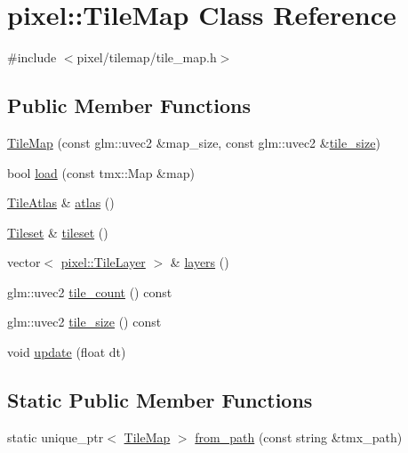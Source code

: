 \hypertarget{classpixel_1_1_tile_map}{}\section{pixel\+:\+:Tile\+Map Class Reference}
\label{classpixel_1_1_tile_map}


{\ttfamily \#include $<$pixel/tilemap/tile\+\_\+map.\+h$>$}

\subsection*{Public Member Functions}
\begin{DoxyCompactItemize}
\item 
\hyperlink{classpixel_1_1_tile_map_adf716168df4051a1f80294951bd7f547}{Tile\+Map} (const glm\+::uvec2 \&map\+\_\+size, const glm\+::uvec2 \&\hyperlink{classpixel_1_1_tile_map_a35e0e8c1f7e3a0739d494929111788cd}{tile\+\_\+size})
\item 
bool \hyperlink{classpixel_1_1_tile_map_a80157d358cbf2eac67adf489057f12fe}{load} (const tmx\+::\+Map \&map)
\item 
\hyperlink{classpixel_1_1_tile_atlas}{Tile\+Atlas} \& \hyperlink{classpixel_1_1_tile_map_a4e88b7241ae5372c0d5e8a102a8eb5e3}{atlas} ()
\item 
\hyperlink{classpixel_1_1_tileset}{Tileset} \& \hyperlink{classpixel_1_1_tile_map_a8c23bb5298f9287a200e29d0eb49ec2d}{tileset} ()
\item 
vector$<$ \hyperlink{classpixel_1_1_tile_layer}{pixel\+::\+Tile\+Layer} $>$ \& \hyperlink{classpixel_1_1_tile_map_a40f23bebe94eee1130692085235c14d5}{layers} ()
\item 
glm\+::uvec2 \hyperlink{classpixel_1_1_tile_map_a8e6564adbe2b58920c5f76369aa819a6}{tile\+\_\+count} () const
\item 
glm\+::uvec2 \hyperlink{classpixel_1_1_tile_map_a35e0e8c1f7e3a0739d494929111788cd}{tile\+\_\+size} () const
\item 
void \hyperlink{classpixel_1_1_tile_map_a34588a5a50421385dcd8f27d51698e12}{update} (float dt)
\end{DoxyCompactItemize}
\subsection*{Static Public Member Functions}
\begin{DoxyCompactItemize}
\item 
static unique\+\_\+ptr$<$ \hyperlink{classpixel_1_1_tile_map}{Tile\+Map} $>$ \hyperlink{classpixel_1_1_tile_map_a77e1743a14959704fb14a94948f7af66}{from\+\_\+path} (const string \&tmx\+\_\+path)
\end{DoxyCompactItemize}
